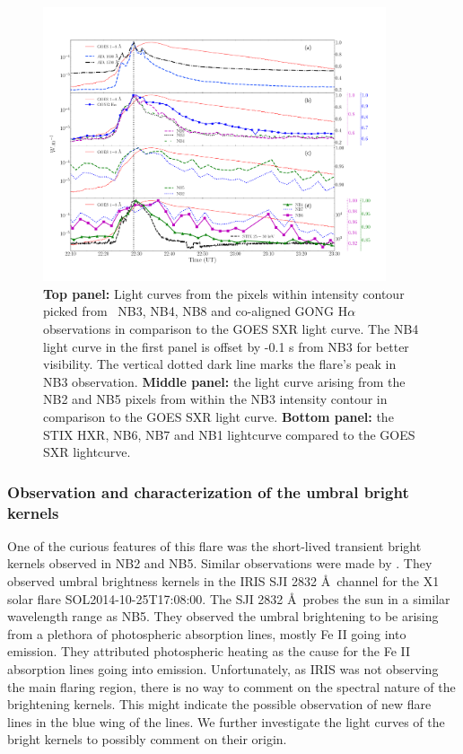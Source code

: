 \begin{figure}
    \centering
    \includegraphics[width=0.9\textwidth,trim={1cm 2cm 1cm 4.2cm},clip]{Figures/feb_22nd/lc_4.pdf}
    \caption[Light curve of the {\suit} NB3 contour from various observatories]{{\bf Top panel:} Light curves from the pixels within intensity contour picked from \suit~NB3, NB4, NB8 and co-aligned GONG H$\alpha$ observations in comparison to the GOES SXR light curve. The NB4 light curve in the first panel is offset by -0.1 s from NB3 for better visibility. The vertical dotted dark line marks the flare's peak in NB3 observation. {\bf Middle panel:} the light curve arising from the NB2 and NB5 pixels from within the NB3 intensity contour in comparison to the GOES SXR light curve. {\bf Bottom panel:} the STIX HXR, NB6, NB7 and NB1 lightcurve compared to the GOES SXR lightcurve. }
    \label{fig:flare_lc_suit}
\end{figure}

\subsubsection{Observation and characterization of the umbral bright kernels}\label{sec:bright_ker}

One of the curious features of this flare was the short-lived transient bright kernels observed in NB2 and NB5. Similar observations were made by \cite{kowalski19}. They observed umbral brightness kernels in the IRIS SJI 2832 {\AA}~channel for the X1 solar flare SOL2014-10-25T17:08:00. The SJI 2832 {\AA}~probes the sun in a similar wavelength range as {\suit} NB5. They observed the umbral brightening to be arising from a plethora of photospheric absorption lines, mostly Fe II going into emission. They attributed photospheric heating as the cause for the Fe II absorption lines going into emission. Unfortunately, as IRIS was not observing the main flaring region, there is no way to comment on the spectral nature of the brightening kernels. This might indicate the possible observation of new flare lines in the blue wing of the  lines. We further investigate the light curves of the bright kernels to possibly comment on their origin.

